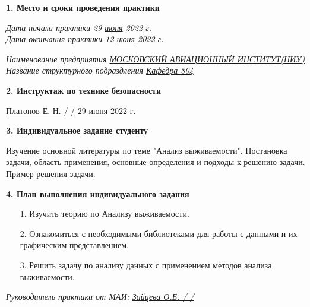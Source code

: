 \textbf{1. Место и сроки проведения практики}

\vspace{20pt}

{\em Дата начала практики \hspace{3cm} 29 \underline{июня} 2022 г.} \\

{\em Дата окончания практики \hspace{3cm} 12 \underline{июня} 2022 г.}

\vspace{20pt}

{\em Наименование предприятия \underline{МОСКОВСКИЙ АВИАЦИОННЫЙ ИНСТИТУТ(НИУ)}} \\

{\em Название структурного подраздления \underline{Кафедра 804}}

\vspace{20pt}

\textbf{2. Инструктаж по технике безопасности}

\vspace{10pt}

\underline{ Платонов Е. Н. / \hspace{3cm} /} \hspace{1cm} 29 \underline{июня} 2022 г.

\vspace{10pt}

\textbf{3. Индивидуальное задание студенту}

Изучение основной литературы по теме "Анализ выживаемости". Постановка задачи, область применения, основные определения и подходы к решению задачи. Пример решения задачи.

\vspace{10pt}
\pagebreak

\textbf{4. План выполнения индивидуального задания}

\begin{itemize}
    \item[1.] Изучить теорию по Анализу выживаемости.
    \item[2.] Ознакомиться с необходимыми библиотеками для работы с данными и их графическим представлением.
    \item[3.] Решить задачу по анализу данных с применением методов анализа выживаемости.
\end{itemize}

{\em Руководитель практики от МАИ: \underline{Зайцева О.Б. / \hspace{3cm} /}}

